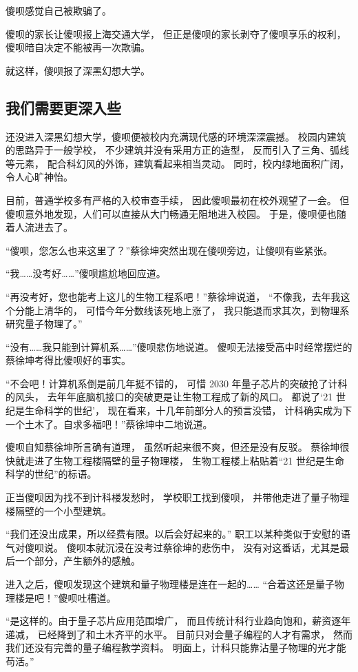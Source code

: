 \documentclass[UTF8,a4paper,11pt]{ctexart}
\newcommand{\p}{傻呗} %
\newcommand{\q}{蔡徐坤} %
\newcommand{\X}{深黑幻想大学} %
\begin{document}
\p 感觉自己被欺骗了。

\p 的家长让\p 报上海交通大学，
但正是\p 的家长剥夺了\p 享乐的权利，
\p 暗自决定不能被再一次欺骗。

就这样，\p 报了\X 。

\subsection{我们需要更深入些}
还没进入\X ，\p 便被校内充满现代感的环境深深震撼。
校园内建筑的思路异于一般学校，
不少建筑并没有采用方正的造型，
反而引入了三角、弧线等元素，
配合科幻风的外饰，建筑看起来相当灵动。
同时，校内绿地面积广阔，令人心旷神怡。

目前，普通学校多有严格的入校审查手续，
因此\p 最初在校外观望了一会。
但\p 意外地发现，人们可以直接从大门畅通无阻地进入校园。
于是，\p 便也随着人流进去了。

“\p，您怎么也来这里了？”\q 突然出现在\p 旁边，让\p 有些紧张。

“我……没考好……”\p 尴尬地回应道。

“再没考好，您也能考上这儿的生物工程系吧！”\q 说道，
“不像我，去年我这个分能上清华的，
可惜今年分数线该死地上涨了，
我只能退而求其次，到物理系研究量子物理了。”

“没有……我只能到计算机系……”\p 悲伤地说道。
\p 无法接受高中时经常摆烂的\q 考得比\p 好的事实。

“不会吧！计算机系倒是前几年挺不错的，
可惜 2030 年量子芯片的突破抢了计科的风头，
去年年底脑机接口的突破更是让生物工程成了新的风口。
都说了‘21 世纪是生命科学的世纪’，
现在看来，十几年前部分人的预言没错，
计科确实成为下一个土木了。自求多福吧！”\q 中二地说道。

\p 自知\q 所言确有道理，
虽然听起来很不爽，但还是没有反驳。
\q 很快就走进了生物工程楼隔壁的量子物理楼，
生物工程楼上粘贴着“21 世纪是生命科学的世纪”的标语。

正当\p 因为找不到计科楼发愁时，
学校职工找到\p，
并带他走进了量子物理楼隔壁的一个小型建筑。

“我们还没出成果，所以经费有限。以后会好起来的。”
职工以某种类似于安慰的语气对\p 说。
\p 本就沉浸在没考过\q 的悲伤中，
没有对这番话，尤其是最后一个部分，产生额外的感触。

进入之后，\p 发现这个建筑和量子物理楼是连在一起的……
“合着这还是量子物理楼是吧！”\p 吐槽道。

“是这样的。由于量子芯片应用范围增广，
而且传统计科行业趋向饱和，薪资逐年递减，
已经降到了和土木齐平的水平。
目前只对会量子编程的人才有需求，
然而我们还没有完善的量子编程教学资料。
明面上，计科只能靠沾量子物理的光才能苟活。”
\end{document}
